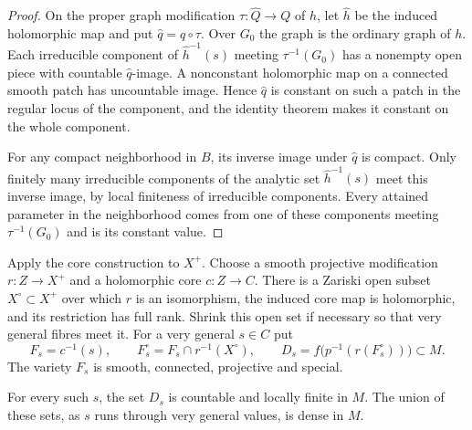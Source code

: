 \begin{proof}
On the proper graph modification $\tau:\widehat Q\to Q$ of $h$, let $\widehat h$ be the induced holomorphic map and put $\widehat q=q\circ\tau$. Over $G_0$ the graph is the ordinary graph of $h$. Each irreducible component of $\widehat h^{-1}(s)$ meeting $\tau^{-1}(G_0)$ has a nonempty open piece with countable $\widehat q$-image. A nonconstant holomorphic map on a connected smooth patch has uncountable image. Hence $\widehat q$ is constant on such a patch in the regular locus of the component, and the identity theorem makes it constant on the whole component.

For any compact neighborhood in $B$, its inverse image under $\widehat q$ is compact. Only finitely many irreducible components of the analytic set $\widehat h^{-1}(s)$ meet this inverse image, by local finiteness of irreducible components. Every attained parameter in the neighborhood comes from one of these components meeting $\tau^{-1}(G_0)$ and is its constant value.
\end{proof}

Apply the core construction to $X^+$.  Choose a smooth projective modification $r:Z\to X^+$ and a holomorphic core $c:Z\to C$.  There is a Zariski open subset $X^\circ\subset X^+$ over which $r$ is an isomorphism, the induced core map is holomorphic, and its restriction has full rank.  Shrink this open set if necessary so that very general fibres meet it.  For a very general $s\in C$ put
\[
 F_s=c^{-1}(s),\qquad
 F_s^\circ=F_s\cap r^{-1}(X^\circ),\qquad
 D_s=f\bigl(p^{-1}(r(F_s^\circ))\bigr)\subset M.
\]
The variety $F_s$ is smooth, connected, projective and special.

\begin{lemma}\label{lem:grp-countable-core-level}
For every such $s$, the set $D_s$ is countable and locally finite in $M$. The union of these sets, as $s$ runs through very general values, is dense in $M$.
\end{lemma}

